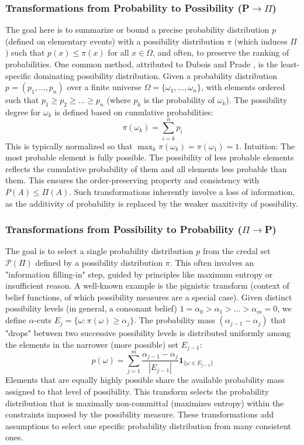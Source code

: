 \subsubsection{Transformations from Probability to Possibility (P$\to\Pi$)}
The goal here is to summarize or bound a precise probability distribution $p$ (defined on elementary events) with a possibility distribution $\pi$ (which induces $\Pi$) such that $p(x) \le \pi(x)$ for all $x \in \Omega$, and often, to preserve the ranking of probabilities.
One common method, attributed to Dubois and Prade \cite{Dubois1997}, is the least-specific dominating possibility distribution.
Given a probability distribution $p=(p_1, \dots, p_n)$ over a finite universe $\Omega = \{\omega_1, \dots, \omega_n\}$, with elements ordered such that $p_1 \ge p_2 \ge \dots \ge p_n$ (where $p_k$ is the probability of $\omega_k$). The possibility degree for $\omega_k$ is defined based on cumulative probabilities:
\[ \pi(\omega_k) = \sum_{i=k}^{n} p_i \]
This is typically normalized so that $\max_k \pi(\omega_k) = \pi(\omega_1) = 1$.
Intuition: The most probable element is fully possible. The possibility of less probable elements reflects the cumulative probability of them and all elements less probable than them. This ensures the order-preserving property and consistency with $P(A) \le \Pi(A)$. Such transformations inherently involve a loss of information, as the additivity of probability is replaced by the weaker maxitivity of possibility.

\subsubsection{Transformations from Possibility to Probability ($\Pi\to$P)}
The goal is to select a single probability distribution $p$ from the credal set $\mathcal{P}(\Pi)$ defined by a possibility distribution $\pi$. This often involves an "information filling-in" step, guided by principles like maximum entropy or insufficient reason.
A well-known example is the pignistic transform (context of belief functions, of which possibility measures are a special case). Given distinct possibility levels (in general, a consonant belief) $1 = \alpha_0 > \alpha_1 > \dots > \alpha_m = 0$, we define $\alpha$-cuts $E_j = \{\omega : \pi(\omega) \ge \alpha_j\}$. The probability mass $(\alpha_{j-1} - \alpha_j)$ that "drops" between two successive possibility levels is distributed uniformly among the elements in the narrower (more possible) set $E_{j-1}$:
\[ p(\omega) = \sum_{j=1}^{m} \frac{\alpha_{j-1} - \alpha_j}{|E_{j-1}|} \mathbf{1}_{\{\omega \in E_{j-1}\}} \]
Elements that are equally highly possible share the available probability mass assigned to that level of possibility. This transform selects the probability distribution that is maximally non-committal (maximizes entropy) within the constraints imposed by the possibility measure. These transformations add assumptions to select one specific probability distribution from many consistent ones.

